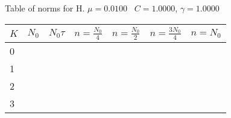 \begin{center}
Table of norms for H. $\mu = 0.0100$ \, $C = 1.0000$, $\gamma = 1.0000$
  
\begin{tabular}{|p{0.8in}|p{0.8in}|p{0.8in}|p{0.8in}|p{0.8in}|p{0.8in}|p{0.8in}|} \hline
$K$ &$N_0$ &$N_0 \tau$ &$n = \frac{N_0}{4}$ &$n = \frac{N_0}{2}$ &$n = \frac{3N_0}{4}$ &$n = N_0$ \\ \hline 
0 & & & & & & \\ \hline 
1 & & & & & & \\ \hline 
2 & & & & & & \\ \hline 
3 & & & & & & \\ \hline 

\end{tabular}\\[20pt]
\end{center}
